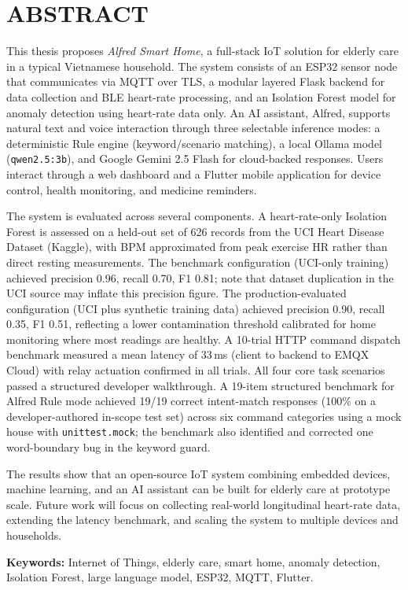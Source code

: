 \chapter*{ABSTRACT}

This thesis proposes \textit{Alfred Smart Home}, a full-stack IoT solution for elderly care in a typical Vietnamese household. The system consists of an ESP32 sensor node that communicates via MQTT over TLS, a modular layered Flask backend for data collection and BLE heart-rate processing, and an Isolation Forest model for anomaly detection using heart-rate data only. An AI assistant, Alfred, supports natural text and voice interaction through three selectable inference modes: a deterministic Rule engine (keyword/scenario matching), a local Ollama model (\texttt{qwen2.5:3b}), and Google Gemini 2.5 Flash for cloud-backed responses. Users interact through a web dashboard and a Flutter mobile application for device control, health monitoring, and medicine reminders.

The system is evaluated across several components. A heart-rate-only Isolation Forest is assessed on a held-out set of 626 records from the UCI Heart Disease Dataset (Kaggle), with BPM approximated from peak exercise HR rather than direct resting measurements. The benchmark configuration (UCI-only training) achieved precision 0.96, recall 0.70, F1 0.81; note that dataset duplication in the UCI source may inflate this precision figure. The production-evaluated configuration (UCI plus synthetic training data) achieved precision 0.90, recall 0.35, F1 0.51, reflecting a lower contamination threshold calibrated for home monitoring where most readings are healthy. A 10-trial HTTP command dispatch benchmark measured a mean latency of 33\,ms (client to backend to EMQX Cloud) with relay actuation confirmed in all trials. All four core task scenarios passed a structured developer walkthrough. A 19-item structured benchmark for Alfred Rule mode achieved 19/19 correct intent-match responses (100\% on a developer-authored in-scope test set) across six command categories using a mock house with \texttt{unittest.mock}; the benchmark also identified and corrected one word-boundary bug in the keyword guard.

The results show that an open-source IoT system combining embedded devices, machine learning, and an AI assistant can be built for elderly care at prototype scale. Future work will focus on collecting real-world longitudinal heart-rate data, extending the latency benchmark, and scaling the system to multiple devices and households.

\bigskip
\noindent\textbf{Keywords:} Internet of Things, elderly care, smart home,
anomaly detection, Isolation Forest, large language model, ESP32, MQTT,
Flutter.
\newpage